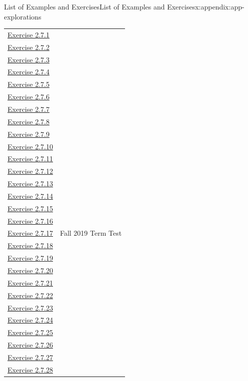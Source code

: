 \documentclass[oneside,10pt,]{book}
\numberwithin{equation}{section}
\begin{document}
\begin{appendixptx}{List of Examples and Exercises}{}{List of Examples and Exercises}{}{}{x:appendix:app-explorations}
\begin{longtable}[l]{ll}
\hyperlink{g:exercise:id478279}{Exercise 2.7.1}& \\
\hyperlink{g:exercise:id478371}{Exercise 2.7.2}& \\
\hyperlink{g:exercise:id478446}{Exercise 2.7.3}& \\
\hyperlink{g:exercise:id478506}{Exercise 2.7.4}& \\
\hyperlink{g:exercise:id248124}{Exercise 2.7.5}& \\
\hyperlink{g:exercise:id248372}{Exercise 2.7.6}& \\
\hyperlink{g:exercise:id248460}{Exercise 2.7.7}& \\
\hyperlink{g:exercise:id248670}{Exercise 2.7.8}& \\
\hyperlink{g:exercise:id249006}{Exercise 2.7.9}& \\
\hyperlink{g:exercise:id249347}{Exercise 2.7.10}& \\
\hyperlink{g:exercise:id247194}{Exercise 2.7.11}& \\
\hyperlink{x:exercise:divex-3x3-grid}{Exercise 2.7.12}& \\
\hyperlink{g:exercise:id247597}{Exercise 2.7.13}& \\
\hyperlink{g:exercise:id247634}{Exercise 2.7.14}& \\
\hyperlink{g:exercise:id247770}{Exercise 2.7.15}& \\
\hyperlink{g:exercise:id247924}{Exercise 2.7.16}& \\
\hyperlink{g:exercise:id247901}{Exercise 2.7.17}& Fall 2019 Term Test\\
\hyperlink{g:exercise:id445839}{Exercise 2.7.18}& \\
\hyperlink{g:exercise:id445922}{Exercise 2.7.19}& \\
\hyperlink{g:exercise:id446015}{Exercise 2.7.20}& \\
\hyperlink{g:exercise:id446108}{Exercise 2.7.21}& \\
\hyperlink{g:exercise:id444006}{Exercise 2.7.22}& \\
\hyperlink{g:exercise:id444059}{Exercise 2.7.23}& \\
\hyperlink{g:exercise:id444122}{Exercise 2.7.24}& \\
\hyperlink{g:exercise:id444254}{Exercise 2.7.25}& \\
\hyperlink{g:exercise:id444316}{Exercise 2.7.26}& \\
\hyperlink{g:exercise:id444382}{Exercise 2.7.27}& \\
\hyperlink{g:exercise:id444399}{Exercise 2.7.28}& \\

\end{longtable}
\end{appendixptx}
\end{document}
